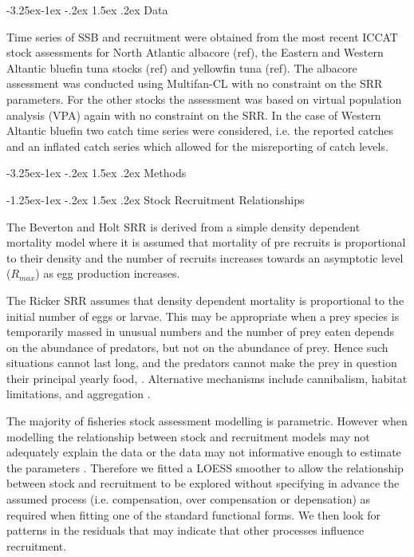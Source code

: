 \documentclass[a4paper, 10pt]{article}
\makeatletter
\renewcommand{\subsubsection}{\@startsection{subsubsection}{3}{\z@}%
  {-1.25ex\@plus -1ex \@minus -.2ex}%
  {1.5ex \@plus .2ex}%
  {\normalfont\slshape}}
\renewcommand{\subsection}{\@startsection{subsection}{2}{\z@}%
  {-3.25ex\@plus -1ex \@minus -.2ex}%
  {1.5ex \@plus .2ex}%
  {\normalfont\bfseries\slshape}}
\makeatother
\begin{document}
\subsection{Data}

Time series of SSB and recruitment were obtained from the most recent ICCAT stock assessments for North Atlantic albacore (ref), 
the Eastern and Western Altantic bluefin tuna stocks (ref) and yellowfin tuna (ref). The albacore assessment was conducted using
Multifan-CL \cite{fournier_multifan-cl} with no constraint on the SRR parameters. For the other stocks
the assessment was based on virtual population analysis (VPA) again with no constraint on the SRR. In the case of Western Altantic bluefin
two catch time series were considered, i.e. the reported catches and an inflated catch series which allowed for the misreporting 
of catch levels.

\subsection{Methods}


\subsubsection{Stock Recruitment Relationships}

The Beverton and Holt SRR \citep{beverton_dynamics_1993} is derived from a simple density dependent mortality model
where it is assumed that mortality of pre recruits is proportional to their density and the number of recruits 
increases towards an asymptotic level ($R_{max}$) as egg production increases. 

The Ricker SRR assumes that density dependent mortality is proportional to the initial number of eggs or larvae. 
This may be appropriate when a prey species is temporarily massed in 
unusual numbers and the number of prey eaten depends on the abundance of predators, 
but not on the abundance of prey. Hence such situations cannot last long, and the predators cannot make the prey in question their principal
yearly food, \cite{ricker1987computation}. Alternative mechanisms 
include cannibalism, habitat limitations, and aggregation 
\citep{rose2001compensatory,brooks2007generalized,powers2004recruitment}. 

The majority of fisheries stock assessment modelling is parametric. However when modelling 
the relationship between stock and recruitment models may not adequately explain the data or the data may not
informative enough to estimate the parameters \cite{hillary2012multi}. Therefore we fitted a LOESS smoother 
\citep{cleveland1992local} to allow the relationship between stock and recruitment to be explored without specifying 
in advance the assumed process (i.e. compensation, over compensation or depensation) as required when fitting one of 
the standard functional forms. We then look for patterns in the residuals that may indicate that other processes
influence recruitment.
\end{document}

